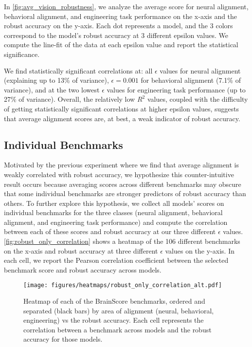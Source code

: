 In \autoref{fig:avg_vision_robustness}, we analyze the average score for neural alignment, behavioral alignment, and engineering task performance on the x-axis and the robust accuracy on the y-axis. Each dot represents a model, and the 3 colors correspond to the model's robust accuracy at 3 different epsilon values. We compute the line-fit of the data at each epsilon value and report the statistical significance. 

We find statistically significant correlations at: all $\epsilon$ values for neural alignment (explaining up to 13\% of variance), $\epsilon=0.001$ for behavioral alignment (7.1\% of variance), and at the two lowest $\epsilon$ values for engineering task performance (up to 27\% of variance). Overall, the relatively low $R^2$ values, coupled with the difficulty of getting statistically significant correlations at higher epsilon values, suggests that average alignment scores are, at best, a weak indicator of robust accuracy. 

\subsection{Individual Benchmarks}
Motivated by the previous experiment where we find that average alignment is weakly correlated with robust accuracy, we hypothesize this counter-intuitive result occurs because averaging scores across different benchmarks may obscure that some individual benchmarks are stronger predictors of robust accuracy than others.
To further explore this hypothesis, we collect all models' scores on individual benchmarks for the three classes (neural alignment, behavioral alignment, and engineering task performance) and compute the correlation between each of these scores and robust accuracy at our three different $\epsilon$ values. \autoref{fig:robust_only_correlation} shows a heatmap of the 106 different benchmarks on the x-axis and robust accuracy at three different $\epsilon$ values on the y-axis. In each cell, we report the Pearson correlation coefficient between the selected benchmark score and robust accuracy across models. 

\begin{figure}[t]
    \centering
    \texttt{[image: figures/heatmaps/robust\_only\_correlation\_alt.pdf]}
    \caption{Heatmap of each of the BrainScore benchmarks, ordered and separated (black bars) by area of alignment (neural, behavioral, engineering) vs the robust accuracy. Each cell represents the correlation between a benchmark across models and the robust accuracy for those models.}
    \label{fig:robust_only_correlation}
\end{figure}

